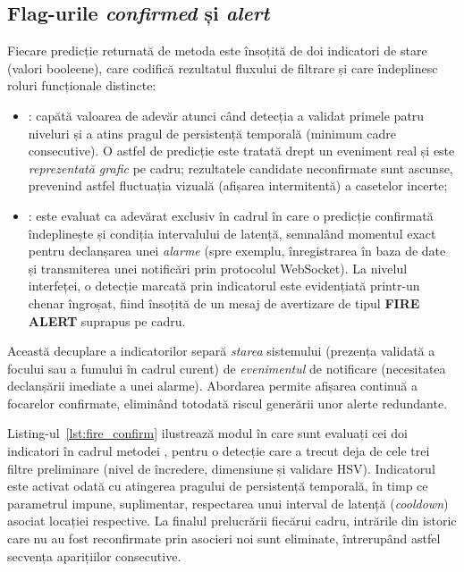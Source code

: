 \documentclass[../../main.tex]{subfiles}
\begin{document}
\subsection{Flag-urile \textit{confirmed} și \textit{alert}}
\label{subsec:flaguri}

Fiecare predicție returnată de metoda  este însoțită de doi indicatori de stare (valori booleene), care codifică rezultatul fluxului de filtrare și care îndeplinesc roluri funcționale distincte:

\begin{itemize}
	\item {}: capătă valoarea de adevăr atunci când detecția a validat primele patru niveluri și a atins pragul de persistență temporală (minimum  cadre consecutive). O astfel de predicție este tratată drept un eveniment real și este \textit{reprezentată grafic} pe cadru; rezultatele candidate neconfirmate sunt ascunse, prevenind astfel fluctuația vizuală (afișarea intermitentă) a casetelor incerte;
	\item {}: este evaluat ca adevărat exclusiv în cadrul în care o predicție confirmată îndeplinește și condiția intervalului de latență, semnalând momentul exact pentru declanșarea unei \textit{alarme} (spre exemplu, înregistrarea în baza de date și transmiterea unei notificări prin protocolul WebSocket). La nivelul interfeței, o detecție marcată prin indicatorul  este evidențiată printr-un chenar îngroșat, fiind însoțită de un mesaj de avertizare de tipul \textbf{FIRE ALERT} suprapus pe cadru.
\end{itemize}

Această decuplare a indicatorilor separă \textit{starea} sistemului (prezența validată a focului sau a fumului în cadrul curent) de \textit{evenimentul} de notificare (necesitatea declanșării imediate a unei alarme). Abordarea permite afișarea continuă a focarelor confirmate, eliminând totodată riscul generării unor alerte redundante.

Listing-ul~\ref{lst:fire_confirm} ilustrează modul în care sunt evaluați cei doi indicatori în cadrul metodei , pentru o detecție care a trecut deja de cele trei filtre preliminare (nivel de încredere, dimensiune și validare HSV). Indicatorul  este activat odată cu atingerea pragului de persistență temporală, în timp ce parametrul  impune, suplimentar, respectarea unui interval de latență (\textit{cooldown}) asociat locației respective. La finalul prelucrării fiecărui cadru, intrările din istoric care nu au fost reconfirmate prin asocieri noi sunt eliminate, întrerupând astfel secvența aparițiilor consecutive.
\end{document}
